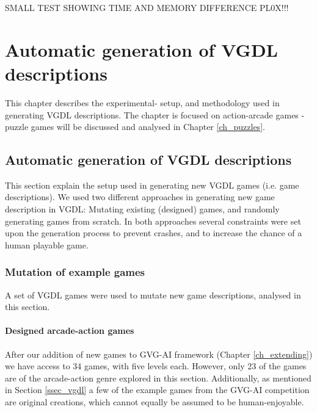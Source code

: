 \documentclass[a4paper,titlepage,final, twoside]{report}
\begin{document}
SMALL TEST SHOWING TIME AND MEMORY DIFFERENCE PL0X!!!

 



\chapter{Automatic generation of VGDL descriptions}
This chapter describes the experimental- setup, and methodology used in generating VGDL descriptions.
The chapter is focused on action-arcade games - puzzle games will be discussed and analysed in Chapter \ref{ch_puzzles}.


\section{Automatic generation of VGDL descriptions}
This section explain the setup used in generating new VGDL games (i.e. game descriptions).
We used two different approaches in generating new game description in VGDL: Mutating existing (designed) games, and randomly generating games from scratch.
In both approaches several constraints were set upon the generation process to prevent crashes, and to increase the chance of a human playable game.


\subsection{Mutation of example games}
\label{method:mutation}
A set of VGDL games were used to mutate new game descriptions, analysed in this section.

\subsubsection*{Designed arcade-action games}
After our addition of new games to GVG-AI framework (Chapter \ref{ch_extending}) we have access to 34 games, with five levels each. 
However, only 23 of the games are of the arcade-action genre explored in this section. Additionally, as mentioned in Section \ref{ssec_vgdl} a few of the example games from the GVG-AI competition are original creations, which cannot equally be assumed to be human-enjoyable.
\end{document}
